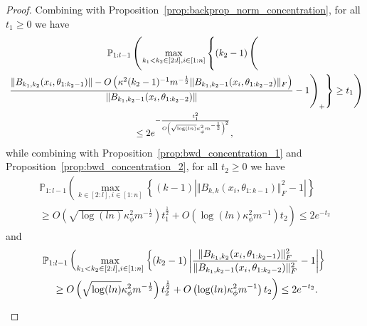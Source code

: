\documentclass[twoside,11pt]{article}
\newcommand{\Prob}{\mathbb{P}}
\begin{document}
\begin{proof}
Combining \citet[Lemma~2.2.2]{Vandervaartetal2023} with Proposition~\ref{prop:backprop_norm_concentration}, for all $t_1 \geq 0$ we have
\begin{multline*}
\Prob_{1:l-1}\left(
\max_{k_1 < k_2 \in [2:l], i \in [1:n]}\left\{ (k_2-1) \left( 
\vphantom{\frac{\Vert B_{k_1, k_2}(x_i, \theta_{1 : k_2-1}) \Vert - O\left( \kappa^2 (k_2-1)^{-1} m^{-\frac{1}{2}} \Vert B_{k_1, k_2-1}(x_i, \theta_{1 : k_2-2}) \Vert_F \right)}{\Vert B_{k_1, k_2-1}(x_i, \theta_{1 : k_2-2}) \Vert}} \right. \right. \right. \\ \left. \left. \left.
\frac{\Vert B_{k_1, k_2}(x_i, \theta_{1 : k_2-1}) \Vert - O\left( \kappa^2 (k_2-1)^{-1} m^{-\frac{1}{2}} \Vert B_{k_1, k_2-1}(x_i, \theta_{1 : k_2-2}) \Vert_F \right)}{\Vert B_{k_1, k_2-1}(x_i, \theta_{1 : k_2-2}) \Vert} - 1 \right)_+ \right\} \geq t_1
\right) \\
\leq 2e^{-\frac{t_1^2}{O\left( \sqrt{\log(ln)} \kappa_\phi^2 m^{-\frac{1}{2}} \right)^2}},
\end{multline*}
while combining \citet[Lemma~2.2.13]{Vandervaartetal2023} with Proposition~\ref{prop:bwd_concentration_1} and Proposition~\ref{prop:bwd_concentration_2}, for all $t_2 \geq 0$ we have
\begin{multline*}
\Prob_{1:l-1}\left( \max_{k \in [2:l], i \in [1:n]}\left\{ (k-1) \left\vert \Vert B_{k,k}(x_i, \theta_{1 : k-1}) \Vert_F^2 - 1 \right\vert \right\} 
\right. \\ \left.
\geq O\left( \sqrt{\log(ln)} \kappa_\phi^2 m^{-\frac{1}{2}} \right) t_1^{\frac{1}{2}} 
+ O\left( \log(ln) \kappa_\phi^2 m^{-1} \right) t_2 \right)
\leq 2e^{-t_2}
\end{multline*}
and
\begin{multline*}
\Prob_{1:l-1}\left( \max_{k_1 < k_2 \in [2:l], i \in [1:n]}\left\{ (k_2-1) \left\vert \frac{\Vert B_{k_1,k_2}(x_i,\theta_{1:k_2-1}) \Vert_F^2}{\Vert B_{k_1,k_2-1}(x_i,\theta_{1:k_2-2}) \Vert_F^2} - 1 \right\vert \right\} 
\right. \\ \left. \vphantom{\left\{ (k_2-1) \left\vert \frac{\Vert B_{k_1,k_2}(x_i,\theta_{1:k_2-1}) \Vert_F^2}{\Vert B_{k_1,k_2-1}(x_i,\theta_{1:k_2-2}) \Vert_F^2} - 1 \right\vert \right\}}
\geq O\left( \sqrt{\log(ln)} \kappa_\phi^2 m^{-\frac{1}{2}} \right) t_2^{\frac{1}{2}} 
+ O\left( \log(ln) \kappa_\phi^2 m^{-1} \right) t_2 \right)
\leq 2e^{-t_2}.
\end{multline*}


\end{proof}
\end{document}

